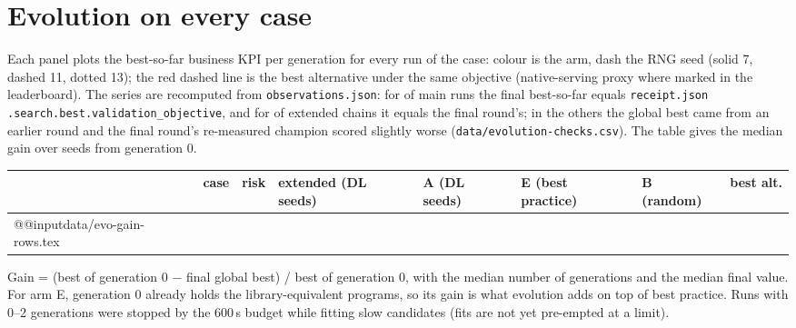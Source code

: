 \documentclass[10.5pt]{article}
\begin{document}
\FloatBarrier
\section{Evolution on every case}\label{sec:evolution}
Each panel plots the best-so-far business KPI per generation for every run of the case: colour is the arm, dash the RNG seed
(solid 7, dashed 11, dotted 13); the red dashed line is the best alternative under the same objective (native-serving proxy where
marked in the leaderboard). The series are recomputed from \texttt{observations.json}: for \EvoMainMatch{} of \EvoMainRuns{} main runs the final best-so-far equals \texttt{receipt.json .search.best.validation\_objective}, and for \EvoExtMatch{} of \EvoExtRuns{} extended chains it equals the final round's; in the others the
global best came from an earlier round and the final round's re-measured champion scored slightly worse
(\texttt{data/evolution-checks.csv}). The table gives the median gain over seeds from generation 0.

\begin{center}\scriptsize\setlength{\tabcolsep}{3pt}
\begin{tabularx}{\linewidth}{@{}l>{\raggedright\arraybackslash}Xl>{\raggedright\arraybackslash}p{2.55cm}>{\raggedright\arraybackslash}p{2.55cm}>{\raggedright\arraybackslash}p{2.55cm}>{\raggedright\arraybackslash}p{2.55cm}r@{}}
\toprule
 & case & risk & extended (DL seeds) & A (DL seeds) & E (best practice) & B (random) & best alt. \\\midrule
\csname @@input\endcsname data/evo-gain-rows.tex
\bottomrule
\end{tabularx}
\end{center}
{\footnotesize Gain = (best of generation 0 $-$ final global best) / best of generation 0, with the median number of generations and the
median final value. For arm E, generation 0 already holds the library-equivalent programs, so its gain is what evolution adds on top of
best practice. Runs with 0--2 generations were stopped by the 600\,s budget while fitting slow candidates (fits are not yet pre-empted at a
limit).}
\end{document}
